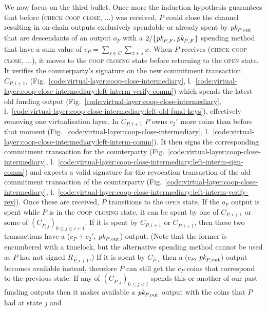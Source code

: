   We now focus on the third bullet. Once more the induction hypothesis
  guarantees that before (\textsc{check coop close}, $\dots$) was received, $P$
  could close the channel resulting in on-chain outputs exclusively spendable or
  already spent by $\textit{pk}_{P, \mathrm{out}}$ that are descendants of an output
  $o_F$ with a $2/\{\textit{pk}_{P, F}, \textit{pk}_{\bar{P}, F}\}$ spending method that have a
  sum value of $c_P = \sum\limits_{s \in C} \sum\limits_{x \in s} x$. When $P$
  receives (\textsc{check coop close}, $\dots$), it moves to the \textsc{coop
  closing} state before returning to the \textsc{open} state. It verifies the
  counterparty's signature on the new commitment transaction $C_{P, i+1}$,
  (Fig.~\ref{code:virtual-layer:coop-close-intermediary},
  l.~\ref{code:virtual-layer:coop-close-intermediary:left-interm-verify-comm})
  which spends the latest old funding output
  (Fig.~\ref{code:virtual-layer:coop-close-intermediary},
  l.~\ref{code:virtual-layer:coop-close-intermediary:left-old-fund-keys}),
  effectively removing one virtualisation layer. In $C_{P, i+1}$ $P$ owns $c_2'$
  more coins than before that moment
  (Fig.~\ref{code:virtual-layer:coop-close-intermediary},
  l.~\ref{code:virtual-layer:coop-close-intermediary:left-interm-comm}). It then
  signs the corresponding commitment transaction for the counterparty
  (Fig.~\ref{code:virtual-layer:coop-close-intermediary},
  l.~\ref{code:virtual-layer:coop-close-intermediary:left-interm-sign-comm}) and
  expects a valid signature for the revocation transaction of the old commitment
  transaction of the counterparty
  (Fig.~\ref{code:virtual-layer:coop-close-intermediary},
  l.~\ref{code:virtual-layer:coop-close-intermediary:left-interm-verify-rev}).
  Once these are received, $P$ transitions to the \textsc{open} state. If the
  $o_F$ output is spent while $P$ is in the \textsc{coop closing} state, it can
  be spent by one of $C_{P, i+1}$ or some of $(C_{\bar{P}, j})_{0 \leq j \leq
  i+1}$. If it is spent by $C_{P, i+1}$ or $C_{\bar{P}, i+1}$, then these two
  transactions have a ($c_P + c_2'$, $\textit{pk}_{P, \mathrm{out}}$) output. (Note that
  the former is encumbered with a timelock, but the alternative spending method
  cannot be used as $P$ has not signed $R_{\bar{P}, i+1}$.) If it is spent by
  $C_{\bar{P}, i}$ then a ($c_P$, $\textit{pk}_{P, \mathrm{out}}$) output becomes
  available instead, therefore $P$ can still get the $c_P$ coins that correspond
  to the previous state. If any of $(C_{\bar{P}, j})_{0 \leq j < i}$ spends this
  or another of our past funding outputs then it makes available a $\textit{pk}_{P,
  \mathrm{out}}$ output with the coins that $P$ had at state $j$ and
